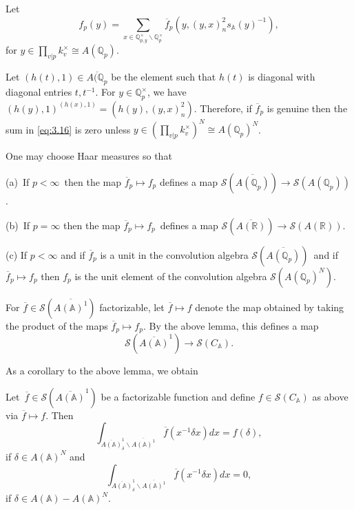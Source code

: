 Let 
\begin{equation}\label{eq:3.16}
f_p(y)=
\sum_{x\in {\mathbb{Q}}_{p,y}^\times
\backslash {\mathbb{Q}}_p^\times}
\overline{f}_p(y ,(y,x)_n^2s_{\mathbb{A}}(y)^{-1} ),
\end{equation}
for $y\in \prod_{v|p}k_v^\times\cong A({\mathbb{Q}}_p)$.

\begin{remark}\label{rem:3.10}
Let $(h(t),1)\in \overline{A({\mathbb{Q}}_p}$ be the element
such that $h(t)$ is diagonal with diagonal entries $t,t^{-1}$.
For $y\in {\mathbb{Q}}_p^\times$, we have
$(h(y),1)^{(h(x),1)}=
(h(y) ,(y,x)_n^2) $.
Therefore, if $\overline{f}_p$ is genuine then
the sum in \eqref{eq:3.16} is zero unless
$y\in (\prod_{v|p}k_v^\times)^N\cong A({\mathbb{Q}}_p)^N$.
\end{remark}

\begin{lemma}\label{lem:3.11}
One may choose Haar measures so that

(a)\ If $p<\infty $\ then the map $\overline{f}_p\longmapsto f_p$
defines a map ${{\mathcal{S}}}(\overline{A({{\mathbb{Q}}}_p)})\rightarrow
{{\mathcal{S}}}(A({{\mathbb{Q}}}_p))$.

(b)\ If $p=\infty$ then the map
$\overline{f}_p\longmapsto f_p$\ defines a map
${{\mathcal{S}}}(\overline{A(\mathbb{R})})
\rightarrow {{\mathcal{S}}}(A({\mathbb{R}}))$.

(c) If $p<\infty $ and if $\overline{f}_p$
is a unit in the convolution
algebra ${\mathcal{S}}(\overline{A({\mathbb{Q}}_p)})$\ and
if $\overline{f}_p\longmapsto f_p$ then $f_p$
is the unit element of
the convolution algebra ${\mathcal{S}}(A({\mathbb{Q}}_p)^N)$.
\end{lemma}

For $\overline{f}\in {\mathcal{S}}(\overline{A({\mathbb{A}})^1})$
factorizable, let $\overline{f}\longmapsto f$ denote the map
obtained by taking the
product of the maps $\overline{f}_p\longmapsto f_p$.
By the above lemma, this defines a map 
\begin{equation}\label{eq:3.17}
{\mathcal{S}}(\overline{A({\mathbb{A}})}^1)\rightarrow {\mathcal{S}}(C_{{\mathbb{A}}}).
\end{equation}

As a corollary to the above lemma, we obtain

\begin{lemma}\label{lem:3.12}
Let\ $\overline{f}\in {\mathcal{S}}(\overline{A({\mathbb{A}})}^1)$ be a
factorizable function and define
$f\in {\mathcal{S}}(C_{\mathbb{A}})$ as above via
$\overline{f}\longmapsto f$. Then 
\[
\int_{\overline{A({\mathbb{A}})}_\delta ^1
\backslash \overline{A({\mathbb{A}})^1}}\overline{f}(x^{-1}\delta x)dx
=f(\delta ),
\]
if $\delta\in A({\mathbb{A}})^N$ and
\[
\int_{\overline{A({\mathbb{A}})}_\delta ^1
\backslash \overline{A({\mathbb{A}})^1}}\overline{f}(x^{-1}\delta x)dx
=0,
\]
if $\delta\in A({\mathbb{A}})-A({\mathbb{A}})^N$.
\end{lemma}

